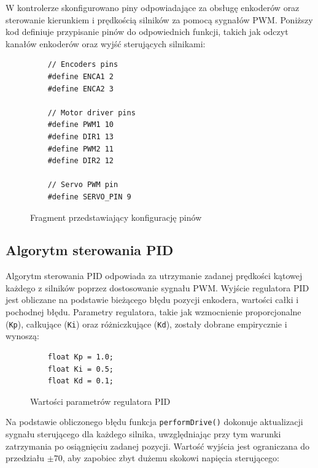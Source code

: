 W kontrolerze skonfigurowano piny odpowiadające za obsługę enkoderów oraz sterowanie kierunkiem i prędkością silników za pomocą sygnałów PWM. Poniższy kod definiuje przypisanie pinów do odpowiednich funkcji, takich jak odczyt kanałów enkoderów oraz wyjść sterujących silnikami:

\begin{figure}[h!]
  \centering
  \begin{lstlisting}
    // Encoders pins
    #define ENCA1 2 
    #define ENCA2 3 
    
    // Motor driver pins
    #define PWM1 10
    #define DIR1 13
    #define PWM2 11
    #define DIR2 12
    
    // Servo PWM pin
    #define SERVO_PIN 9
  \end{lstlisting}
  \caption{Fragment przedstawiający konfigurację pinów}
  \label{fig:config}
\end{figure}

\subsection{Algorytm sterowania PID}

Algorytm sterowania PID odpowiada za utrzymanie zadanej prędkości kątowej każdego z silników poprzez dostosowanie sygnału PWM. Wyjście regulatora PID jest obliczane na podstawie bieżącego błędu pozycji enkodera, wartości całki i pochodnej błędu. Parametry regulatora, takie jak wzmocnienie proporcjonalne (\texttt{Kp}), całkujące (\texttt{Ki}) oraz różniczkujące (\texttt{Kd}), zostały dobrane empirycznie i wynoszą:

\begin{figure}[h!]
  \centering
  \begin{lstlisting}
    float Kp = 1.0; 
    float Ki = 0.5; 
    float Kd = 0.1; 
  \end{lstlisting}
  \caption{Wartości parametrów regulatora PID}
  \label{fig:config-pid}
  \end{figure}

Na podstawie obliczonego błędu funkcja \texttt{performDrive()} dokonuje aktualizacji sygnału sterującego dla każdego silnika, uwzględniając przy tym warunki zatrzymania po osiągnięciu zadanej pozycji. Wartość wyjścia jest ograniczana do przedziału \( \pm 70 \), aby zapobiec zbyt dużemu skokowi napięcia sterującego:

